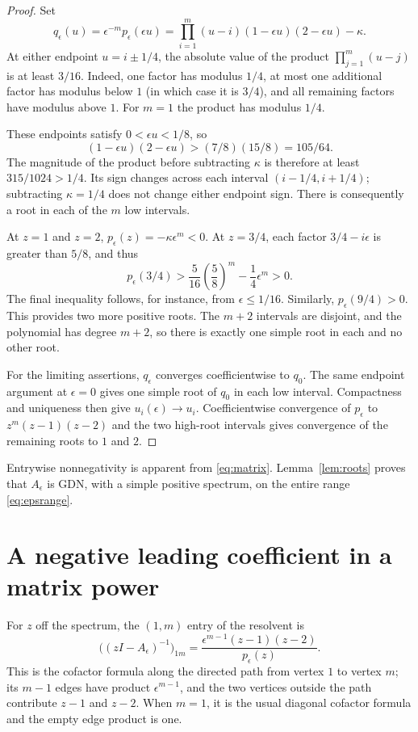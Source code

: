 \documentclass[11pt]{article}
\begin{document}
\begin{proof}
Set
\[
q_\epsilon(u)=\epsilon^{-m}p_\epsilon(\epsilon u)
=\prod_{i=1}^m(u-i)(1-\epsilon u)(2-\epsilon u)-\kappa.
\]
At either endpoint $u=i\pm1/4$, the absolute value of the product $\prod_{j=1}^m(u-j)$ is at least $3/16$. Indeed, one factor has modulus $1/4$, at most one additional factor has modulus below $1$ (in which case it is $3/4$), and all remaining factors have modulus above $1$. For $m=1$ the product has modulus $1/4$.

These endpoints satisfy $0<\epsilon u<1/8$, so
\[
(1-\epsilon u)(2-\epsilon u)>(7/8)(15/8)=105/64.
\]
The magnitude of the product before subtracting $\kappa$ is therefore at least $315/1024>1/4$. Its sign changes across each interval $(i-1/4,i+1/4)$; subtracting $\kappa=1/4$ does not change either endpoint sign. There is consequently a root in each of the $m$ low intervals.

At $z=1$ and $z=2$, $p_\epsilon(z)=-\kappa\epsilon^m<0$. At $z=3/4$, each factor $3/4-i\epsilon$ is greater than $5/8$, and thus
\[
p_\epsilon(3/4)>\frac5{16}\left(\frac58\right)^m-\frac14\epsilon^m>0.
\]
The final inequality follows, for instance, from $\epsilon\le1/16$. Similarly, $p_\epsilon(9/4)>0$. This provides two more positive roots. The $m+2$ intervals are disjoint, and the polynomial has degree $m+2$, so there is exactly one simple root in each and no other root.

For the limiting assertions, $q_\epsilon$ converges coefficientwise to $q_0$. The same endpoint argument at $\epsilon=0$ gives one simple root of $q_0$ in each low interval. Compactness and uniqueness then give $u_i(\epsilon)\to u_i$. Coefficientwise convergence of $p_\epsilon$ to $z^m(z-1)(z-2)$ and the two high-root intervals gives convergence of the remaining roots to $1$ and $2$.
\end{proof}

Entrywise nonnegativity is apparent from \eqref{eq:matrix}. Lemma~\ref{lem:roots} proves that $A_\epsilon$ is GDN, with a simple positive spectrum, on the entire range \eqref{eq:epsrange}.

\section{A negative leading coefficient in a matrix power}
For $z$ off the spectrum, the $(1,m)$ entry of the resolvent is
\begin{equation}\label{eq:resolvent}
\bigl((zI-A_\epsilon)^{-1}\bigr)_{1m}
=\frac{\epsilon^{m-1}(z-1)(z-2)}{p_\epsilon(z)}.
\end{equation}
This is the cofactor formula along the directed path from vertex $1$ to vertex $m$; its $m-1$ edges have product $\epsilon^{m-1}$, and the two vertices outside the path contribute $z-1$ and $z-2$. When $m=1$, it is the usual diagonal cofactor formula and the empty edge product is one.
\end{document}
